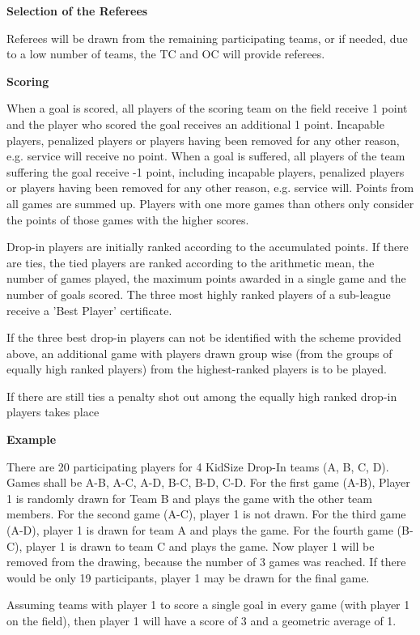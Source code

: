{\bigskip
 
{\bfseries Selection of the Referees}

Referees will be drawn from the remaining participating teams, or if needed, due to a low number of teams, the TC and OC will provide referees.

\bigskip
 
{\bfseries Scoring}

When a goal is scored, all players of the scoring team on the field receive 1 point and the player who scored the goal receives an additional 1 point. Incapable players, penalized players or players having been removed for any other reason, e.g. service will receive no point. When a goal is suffered, all players of the team suffering the goal receive -1 point, including incapable players, penalized players or players having been removed for any other reason, e.g. service will. Points from all games are summed up. Players with one more games than others only consider the points of those games with the higher scores.

Drop-in players are initially ranked according to the accumulated points. If there are ties, the tied players are ranked according to the arithmetic mean, the number of games played, the maximum points awarded in a single game and the number of goals scored. The three most highly ranked players of a sub-league receive a 'Best Player' certificate.

If the three best drop-in players can not be identified with the scheme provided above, an additional game with players drawn group wise (from the groups of equally high ranked players) from the highest-ranked players is to be played.

If there are still ties a penalty shot out among the equally high ranked drop-in players takes place

\bigskip 
 
{\bfseries Example}
 
There are 20 participating players for 4 KidSize Drop-In teams (A, B, C, D). Games shall be A-B, A-C, A-D, B-C, B-D, C-D. For the first game (A-B), Player 1 is randomly drawn for Team B and plays the game with the other team members. For the second game (A-C), player 1 is not drawn. For the third game (A-D), player 1 is drawn for team A and plays the game. For the fourth game (B-C), player 1 is drawn to team C and plays the game. Now player 1 will be removed from the drawing, because the number of 3 games was reached. If there would be only 19 participants, player 1 may be drawn for the final game.

Assuming teams with player 1 to score a single goal in every game (with player 1 on the field), then player 1 will have a score of 3 and a geometric average of 1. }

